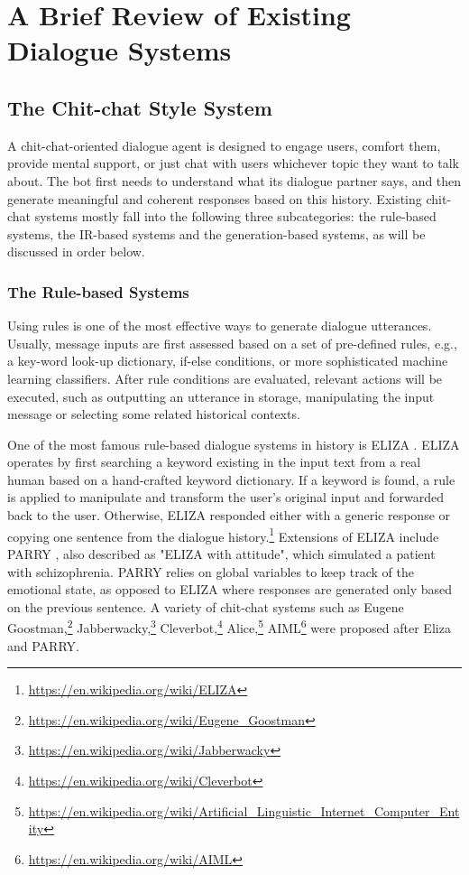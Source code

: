 \section{A Brief Review of Existing Dialogue Systems}
\subsection{The Chit-chat Style System}
A chit-chat-oriented dialogue agent is designed to engage users, comfort them, provide mental support, or just chat with users whichever topic they want to talk about. 
The bot first needs to understand what its dialogue partner says, and then 
 generate meaningful and coherent responses based on this history.  
 Existing chit-chat systems mostly fall into the following three subcategories: the rule-based systems, the IR-based systems and the generation-based systems, as will be discussed in order below. 

\subsubsection{The Rule-based Systems}
Using rules is one of the most effective ways to generate dialogue utterances. 
Usually,
message inputs are first assessed  based on a set of pre-defined rules, e.g., 
a key-word look-up dictionary,
if-else conditions, or more sophisticated machine learning classifiers.
After rule conditions are evaluated, relevant actions will be executed, such as 
outputting an utterance in storage, manipulating the input message or selecting some related historical contexts. 


One of the most famous 
rule-based 
dialogue systems in history is  ELIZA \cite{weizenbaum1966eliza}. 
ELIZA operates by first searching a keyword existing in the input text from a real human
 based on a hand-crafted keyword dictionary. If a keyword is found, a rule is applied to 
 manipulate and
 transform the 
user's original input and forwarded back to the user. Otherwise, ELIZA responded either with a generic response or copying one sentence from the dialogue history.\footnote{\url{https://en.wikipedia.org/wiki/ELIZA}} 
 Extensions of ELIZA include PARRY \cite{parkinson1977conversational}, also described as "ELIZA with attitude",
which simulated a patient with schizophrenia. 
PARRY relies on global variables to keep track of the emotional state, as opposed to ELIZA where responses are generated only based on the previous sentence. 
A variety of chit-chat systems such as  Eugene Goostman,\footnote{\url{https://en.wikipedia.org/wiki/Eugene_Goostman}} 
Jabberwacky,\footnote{\url{https://en.wikipedia.org/wiki/Jabberwacky}} 
Cleverbot,\footnote{\url{https://en.wikipedia.org/wiki/Cleverbot}} 
Alice,\footnote{\url{https://en.wikipedia.org/wiki/Artificial_Linguistic_Internet_Computer_Entity}} 
AIML\footnote{\url{https://en.wikipedia.org/wiki/AIML}} were proposed after Eliza and PARRY. 

